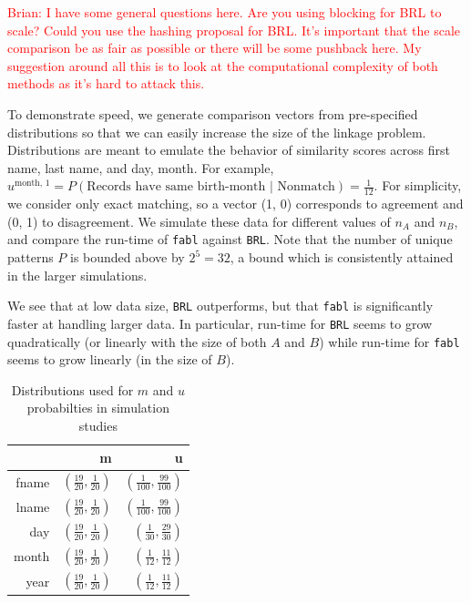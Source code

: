 \documentclass[12pt,letterpaper]{article}
\newcommand{\1}[1]{\mathbb{I}\!\left[#1\right]} %
\begin{document}
\textcolor{red}{Brian: I have some general questions here. Are you using blocking for BRL to scale? Could you use the hashing proposal for BRL. It's important that the scale comparison be as fair as possible or there will be some pushback here. My suggestion around all this is to look at the computational complexity of both methods as it's hard to attack this.}	

To demonstrate speed, we generate comparison vectors from pre-specified
distributions so that we can easily increase the size of the linkage
problem. Distributions are meant to emulate the behavior of similarity
scores across first name, last name, and day, month. For example, $u^{\text{month, 1}} = P(\text{Records have same birth-month | Nonmatch}) = \frac{1}{12}$. For simplicity, we
consider only exact matching, so a vector (1, 0) corresponds to
agreement and (0, 1) to disagreement. We simulate these data for
different values of \(n_A\) and \(n_B\), and compare the run-time of
\texttt{fabl} against \texttt{BRL}. Note that the number of unique
patterns \(P\) is bounded above by \(2^5 = 32\), a bound which is
consistently attained in the larger simulations.

We see that at low data size, \texttt{BRL} outperforms, but that
\texttt{fabl} is significantly faster at handling larger data. In
particular, run-time for \texttt{BRL} seems to grow quadratically (or
linearly with the size of both \(A\) and \(B\)) while run-time for
\texttt{fabl} seems to grow linearly (in the size of \(B\)).

\begin{table}[t]
	\centering
	\begin{tabular}{rrr}
		\hline
		& m & u \\ 
		\hline
		fname & $\left(\frac{19}{20}, \frac{1}{20}\right)$ & $\left(\frac{1}{100}, \frac{99}{100}\right)$ \\ 
		lname & $\left(\frac{19}{20}, \frac{1}{20}\right)$ & $\left(\frac{1}{100}, \frac{99}{100}\right)$ \\ 
		day & $\left(\frac{19}{20}, \frac{1}{20}\right)$ & $\left(\frac{1}{30}, \frac{29}{30}\right)$ \\ 
		month & $\left(\frac{19}{20}, \frac{1}{20}\right)$ & $\left(\frac{1}{12}, \frac{11}{12}\right)$ \\ 
		year & $\left(\frac{19}{20}, \frac{1}{20}\right)$ & $\left(\frac{1}{12}, \frac{11}{12}\right)$ \\ 
		\hline
	\end{tabular}
\caption{Distributions used for $m$ and $u$ probabilties in simulation studies}\label{fig:distributions}
\end{table}
\end{document}
